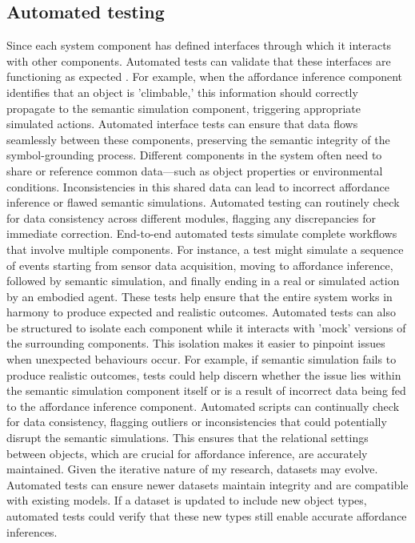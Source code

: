 \documentclass[11pt]{article}
\begin{document}
\subsection{Automated testing}
Since each system component has defined interfaces through which it interacts with other components. Automated tests can validate that these interfaces are functioning as expected \cite{renggli2019continuous}. For example, when the affordance inference component identifies that an object is 'climbable,' this information should correctly propagate to the semantic simulation component, triggering appropriate simulated actions. Automated interface tests can ensure that data flows seamlessly between these components, preserving the semantic integrity of the symbol-grounding process.
Different components in the system often need to share or reference common data—such as object properties or environmental conditions. Inconsistencies in this shared data can lead to incorrect affordance inference or flawed semantic simulations. Automated testing can routinely check for data consistency across different modules, flagging any discrepancies for immediate correction. End-to-end automated tests simulate complete workflows that involve multiple components. For instance, a test might simulate a sequence of events starting from sensor data acquisition, moving to affordance inference, followed by semantic simulation, and finally ending in a real or simulated action by an embodied agent. These tests help ensure that the entire system works in harmony to produce expected and realistic outcomes. Automated tests can also be structured to isolate each component while it interacts with 'mock' versions of the surrounding components. This isolation makes it easier to pinpoint issues when unexpected behaviours occur. For example, if semantic simulation fails to produce realistic outcomes, tests could help discern whether the issue lies within the semantic simulation component itself or is a result of incorrect data being fed to the affordance inference component. Automated scripts can continually check for data consistency, flagging outliers or inconsistencies that could potentially disrupt the semantic simulations. This ensures that the relational settings between objects, which are crucial for affordance inference, are accurately maintained. Given the iterative nature of my research, datasets may evolve. Automated tests can ensure newer datasets maintain integrity and are compatible with existing models. If a dataset is updated to include new object types, automated tests could verify that these new types still enable accurate affordance inferences. 
\end{document}
